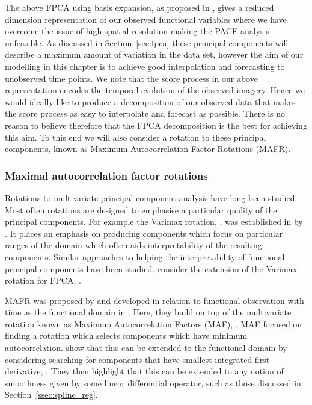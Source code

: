 The above FPCA using basis expansion, as proposed in \citep[Chapter~8]{ramsay_functional_2010}, gives a reduced dimension representation of our observed functional variables where we have overcome the issue of high spatial resolution making the PACE analysis unfeasible.
As discussed in Section~\ref{sec:fpca} these principal components will describe a maximum amount of variation in the data set, however the aim of our modelling in this chapter is to achieve good interpolation and forecasting to unobserved time points.
We note that the score process in our above representation encodes the temporal evolution of the observed imagery. 
Hence we would ideally like to produce a decomposition of our observed data that makes the score process as easy to interpolate and forecast as possible. 
There is no reason to believe therefore that the FPCA decomposition is the best for achieving this aim.
To this end we will also consider a rotation to these principal components, known as Maximum Autocorrelation Factor Rotations (MAFR).

\subsubsection{Maximal autocorrelation factor rotations \label{ssec:mafr}}
Rotations to multivariate principal component analysis have long been studied.
Most often rotations are designed to emphasise a particular quality of the principal components. 
For example the Varimax rotation, \citep{kaiser_varimax_1958}, was established in \citeyear{kaiser_varimax_1958} by \citeauthor{kaiser_varimax_1958}.
It places an emphasis on producing components which focus on particular ranges of the domain which often aids interpretability of the resulting components.
Similar approaches to helping the interpretability of functional principal components have been studied.
\citeauthor{ramsay_functional_2010} consider the extension of the Varimax rotation for FPCA, \citep{ramsay_functional_2010}. 

MAFR was proposed by \citeauthor{hooker_maximal_2015} and developed in relation to functional observation with time as the functional domain in \citep{hooker_maximal_2016}.
Here, they build on top of the multivariate rotation known as Maximum Autocorrelation Factors (MAF), \citep{switzer_minmax_1984}.
MAF focused on finding a rotation which selects components which have minimum autocorrelation. 
\citeauthor{hooker_maximal_2016} show that this can be extended to the functional domain by considering searching for components that have smallest integrated first derivative, \citep{hooker_maximal_2016}. 
They then highlight that this can be extended to any notion of smoothness given by some linear differential operator, such as those discussed in Section~\ref{ssec:spline_reg}. 

